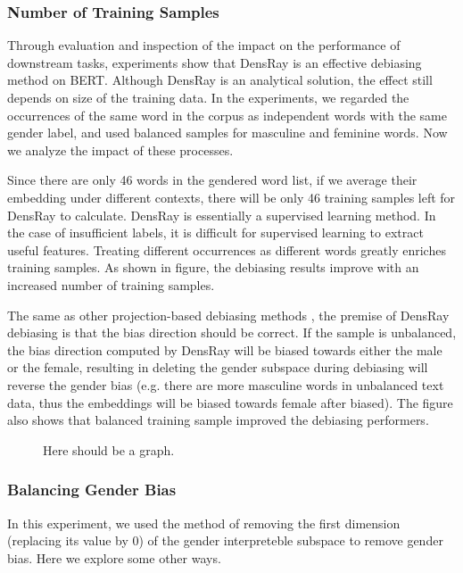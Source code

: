 \subsubsection{Number of Training Samples}
Through evaluation and inspection of the impact on the performance of downstream tasks, experiments show that DensRay is an effective debiasing method on BERT. Although DensRay is an analytical solution, the effect still depends on size of the training data. In the experiments, we regarded the occurrences of the same word in the corpus as independent words with the same gender label, and used balanced samples for masculine and feminine words. Now we analyze the impact of these processes.

Since there are only 46 words in the gendered word list, if we average their embedding under different contexts, there will be only 46 training samples left for DensRay to calculate. DensRay is essentially a supervised learning method. In the case of insufficient labels, it is difficult for supervised learning to extract useful features. Treating different occurrences as different words greatly enriches training samples. As shown in figure, the debiasing results improve with an increased number of training samples.

The same as other projection-based debiasing methods \citep{bolukbasi2016man,zhao2019gender,dev2019attenuating, karve2019conceptor}, the premise of DensRay debiasing is that the bias direction should be correct. If the sample is unbalanced, the bias direction computed by DensRay will be biased towards either the male or the female, resulting in deleting the gender subspace during debiasing will reverse the gender bias (e.g. there are more masculine words in unbalanced text data, thus the embeddings will be biased towards female after biased). The figure also shows that balanced training sample improved the debiasing performers. 
\begin{figure}
    \centering
    \caption{Here should be a graph.}
    \label{fig:my_label}
\end{figure}

\subsubsection{Balancing Gender Bias}
In this experiment, we used the method of removing the first dimension (replacing its value by $0$) of the gender interpreteble subspace to remove gender bias. Here we explore some other ways.

